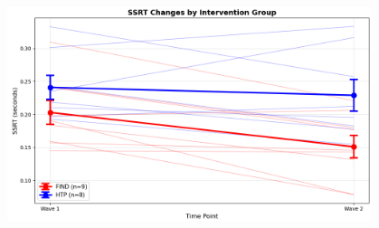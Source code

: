 \documentclass[final]{beamer}
\newlength{\sepwidth}
\newlength{\colwidth}
\newcommand{\separatorcolumn}{\begin{column}{\sepwidth}\end{column}}
\begin{document}
\begin{frame}[t]
\begin{columns}[t]
\begin{column}{\colwidth}
    \begin{figure}[ht]
        \centering
          \includegraphics[clip, width=\textwidth]{ssrt.png}
          \label{fig:ssrt}
    \end{figure}

\end{column}

\separatorcolumn
\end{columns}
\end{frame}
\end{document}
